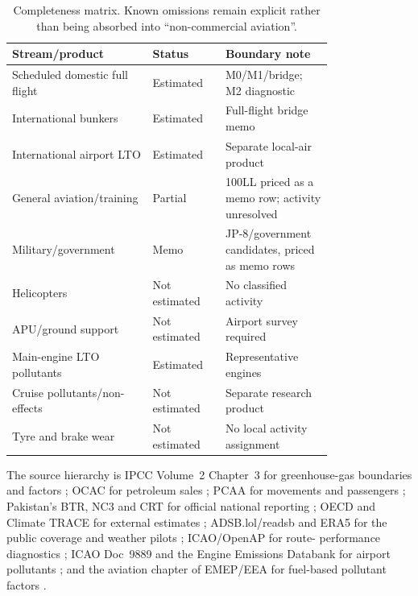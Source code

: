 \begin{table}[htbp]
\centering
\scriptsize
\begin{tabular}{@{}p{0.36\linewidth}p{0.16\linewidth}p{0.27\linewidth}@{}}
\toprule
\textbf{Stream/product} & \textbf{Status} & \textbf{Boundary note} \\
\midrule
Scheduled domestic full flight & Estimated & M0/M1/bridge; M2 diagnostic \\
International bunkers & Estimated & Full-flight bridge memo \\
International airport LTO & Estimated & Separate local-air product \\
General aviation/training & Partial & 100LL priced as a memo row; activity unresolved \\
Military/government & Memo & JP-8/government candidates, priced as memo rows \\
Helicopters & Not estimated & No classified activity \\
APU/ground support & Not estimated & Airport survey required \\
Main-engine LTO pollutants & Estimated & Representative engines \\
Cruise pollutants/non-\COtwo{} effects & Not estimated & Separate research product \\
Tyre and brake wear & Not estimated & No local activity assignment \\
\bottomrule
\end{tabular}
\caption{Completeness matrix. Known omissions remain explicit rather than being absorbed into
``non-commercial aviation''.}
\label{tab:completeness}
\end{table}

The source hierarchy is IPCC Volume~2 Chapter~3 for greenhouse-gas boundaries and factors
\citep{ipcc2006energy}; OCAC for petroleum sales \citep{ocacaviation}; PCAA for movements and
passengers \citep{pcaaairports2024,pcaaairlines2024}; Pakistan's BTR, NC3 and CRT for official
national reporting \citep{pakbtr2024,paknc32025,pakcrt2026}; OECD and Climate TRACE for
external estimates \citep{oecdaviation,climatetrace}; ADSB.lol/readsb and ERA5 for the public
coverage and weather pilots \citep{adsblolhistory,readsbjson,era5arco}; ICAO/OpenAP for route-
performance diagnostics \citep{icaoicec2024,sun2020openap};
ICAO Doc~9889 and the Engine Emissions Databank for airport pollutants
\citep{icao9889,icaoeedb}; and the aviation chapter of EMEP/EEA for fuel-based pollutant
factors \citep{emep2023aviation}.
